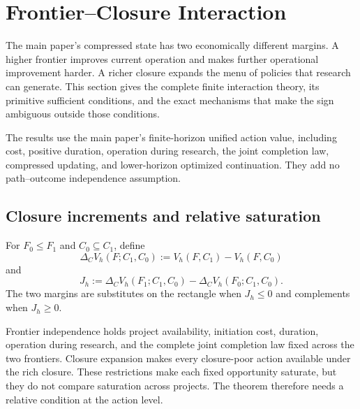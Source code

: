 \section{Frontier--Closure Interaction}
\label{supp:frontier-closure-interaction}\label{app:interaction-proof}

The main paper's compressed state has two economically different margins.  A
higher frontier improves current operation and makes further operational
improvement harder.  A richer closure expands the menu of policies that
research can generate.  This section gives the complete finite interaction
theory, its primitive sufficient conditions, and the exact mechanisms that
make the sign ambiguous outside those conditions.

The results use the main paper's finite-horizon unified action value,
including cost, positive duration, operation during research, the joint
completion law, compressed updating, and lower-horizon optimized
continuation.  They add no path--outcome independence assumption.

\subsection{Closure increments and relative saturation}

\begin{definition}
\label{def:frontier-closure-interaction}
For \(F_0\le F_1\) and \(C_0\subseteq C_1\), define
\[
 \Delta_CV_h(F;C_1,C_0):=V_h(F,C_1)-V_h(F,C_0)
\]
and
\[
 J_h:=\Delta_CV_h(F_1;C_1,C_0)
      -\Delta_CV_h(F_0;C_1,C_0).
\]
The two margins are substitutes on the rectangle when \(J_h\le0\) and
complements when \(J_h\ge0\).
\end{definition}

Frontier independence holds project availability, initiation cost, duration,
operation during research, and the complete joint completion law fixed across
the two frontiers.  Closure expansion makes every closure-poor action
available under the rich closure.  These restrictions make each fixed
opportunity saturate, but they do not compare saturation across projects.
The theorem therefore needs a relative condition at the action level.

